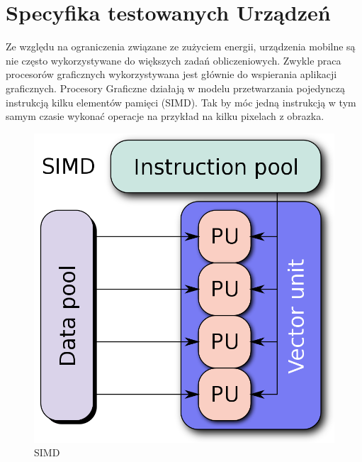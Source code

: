 \section[Specyfika testowanych Urządzeń]{Specyfika testowanych Urządzeń}
Ze względu na ograniczenia związane ze zużyciem energii, urządzenia mobilne są nie często wykorzystywane do większych zadań obliczeniowych. Zwykle praca procesorów graficznych wykorzystywana jest głównie do wspierania aplikacji graficznych. Procesory Graficzne działają w modelu przetwarzania pojedynczą instrukcją kilku elementów pamięci (SIMD). Tak by móc jedną instrukcją w tym samym czasie wykonać operacje na przykład na kilku pixelach z obrazka. 
\begin{figure}[H]
	\includegraphics[scale=0.16]{imgs/SIMD2.svg.png}
	\caption{SIMD \cite{SIMD}}
\end{figure}

